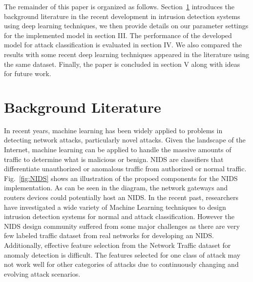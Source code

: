 \documentclass[runningheads]{llncs}
\newcommand{\sect}[1]{Section~\ref{#1}}
\newcommand{\fig}[1]{Fig.~\ref{#1}}
\begin{document}

The remainder of this paper is organized as follows. \sect{sec:methods} introduces the background literature in the recent development in intrusion detection systems using deep learning techniques, we then provide details on our parameter settings for the implemented model in section III. The performance of the developed model for attack classification is evaluated in section IV. We also compared the results with some recent deep learning techniques appeared in the literature using the same dataset. Finally, the paper is concluded in section V along with ideas for future work.
\\






\section{ Background Literature} \label{sec:methods}
In recent years, machine learning has been widely applied to problems in detecting network attacks, particularly novel attacks.  Given the landscape of the Internet, machine learning can be applied to handle the massive amounts of traffic to determine what is malicious or benign. NIDS are classifiers that differentiate unauthorized or anomalous
traffic from authorized or normal traffic. \fig{fig:NIDS} shows an illustration of the propoed components for the NIDS implementation. As can be seen in the diagram, the network gateways and routers devices could potentially host an NIDS.
In the recent past, researchers have investigated a wide variety of Machine Learning techniques to design intrusion detection systems for normal and attack classification. However the NIDS design community  suffered from some major challenges as there are very few labeled traffic dataset from real networks for developing an NIDS. Additionally, effective feature selection from the Network Traffic dataset for anomaly detection is difficult. The features selected for one class of attack may not work well for other categories of attacks due to continuously changing and evolving attack scenarios. %
\end{document}
